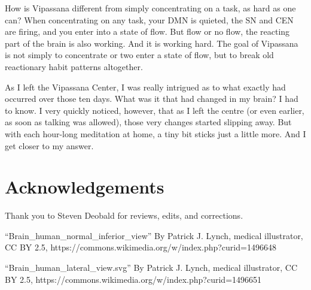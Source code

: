 \documentclass[a4paper, amsfonts, amssymb, amsmath, reprint, showkeys, nofootinbib, twoside]{revtex4-1}
\begin{document}
How is Vipassana different from simply concentrating on a task, as hard as one can?
When concentrating on any task, your DMN is quieted, the SN and CEN are firing, and you
enter into a state of flow. But flow or no flow, the reacting part of the brain is
also working. And it is working hard. The goal of Vipassana is not simply to
concentrate or two enter a state of flow, but to break old reactionary habit patterns
altogether.

As I left the Vipassana Center, I was really intrigued as to what exactly had
occurred over those ten days. What was it that had changed in my brain? I had to
know. I very quickly noticed, however, that as I left the centre (or even earlier, as
soon as talking was allowed), those very changes started slipping away. But with each
hour-long meditation at home, a tiny bit sticks just a little more. And I get closer
to my answer.

\section{Acknowledgements}

Thank you to Steven Deobald for reviews, edits, and corrections.

``Brain\_human\_normal\_inferior\_view'' By Patrick J. Lynch, medical illustrator, CC BY
2.5, https://commons.wikimedia.org/w/index.php?curid=1496648

``Brain\_human\_lateral\_view.svg'' By Patrick J. Lynch, medical illustrator, CC BY
2.5, https://commons.wikimedia.org/w/index.php?curid=1496651
\end{document}
